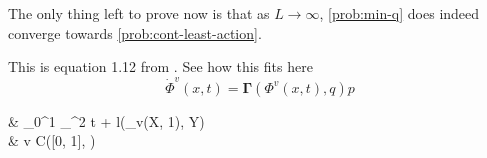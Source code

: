 The only thing left to prove now is that as $L \rightarrow \infty$, \cref{prob:min-q} does indeed converge towards \cref{prob:cont-least-action}.



This is equation 1.12 from \cite{owhadi20}.
See how this fits here
\begin{equation}
	\label{eq:phi-v-differential-equation}
	\dot{\Phi}^v(x, t) = \mathbf{\Gamma}(\Phi^v(x, t), q) p
\end{equation}

\begin{problem}
	\begin{cases}
		&  \int_{0}^{1} _^2 t
		+ l(\phi_v(X, 1), Y)\\
		& v \in C([0, 1], )\\
	\end{cases}
\end{problem}

\begin{theorem}
	
\end{theorem}
